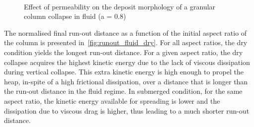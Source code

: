 \begin{figure}
\\
\caption{Effect of permeability on the deposit morphology of a granular column 
collapse in fluid (a = 0.8)}
\label{fig:a08_dense_snapshots}
\end{figure}

The normalised final run-out distance as a function of the initial aspect ratio 
of the column is presented in~\cref{fig:runout_fluid_dry}. For all aspect 
ratios, the dry condition yields the longest run-out distance. For a given 
aspect ratio, the dry collapse acquires the highest kinetic energy due to 
the lack of viscous dissipation during vertical collapse. This extra kinetic 
energy is high enough to propel the heap, in-spite of a high frictional 
dissipation, over a distance that is longer than the run-out distance in 
the fluid regime. In submerged condition, for the same aspect ratio, 
the kinetic energy available for spreading is lower and the dissipation 
due to viscous drag is higher, thus leading to a much shorter run-out
distance. 

